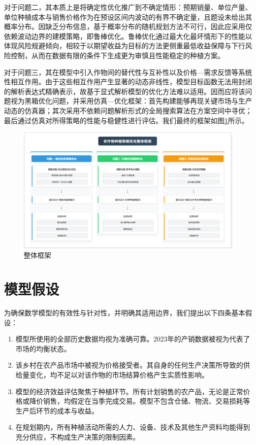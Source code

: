 对于问题二，其本质上是将确定性优化推广到不确定情形：预期销量、单位产量、单位种植成本与销售价格作为在预设区间内波动的有界不确定量，且题设未给出其概率分布。因缺乏分布信息，基于概率分布的随机规划方法不可行，因此应采用仅依赖波动边界的建模策略，即鲁棒优化。鲁棒优化通过最大化最坏情形下的性能以体现风险规避倾向，相较于以期望收益为目标的方法更侧重最低收益保障与下行风险控制，从而在数据有限的条件下生成更为审慎且性能稳定的种植方案。

对于问题三，其在模型中引入作物间的替代性与互补性以及价格—需求反馈等系统性相互作用。由于这些相互作用产生显著的动态非线性，模型目标函数无法用封闭的解析表达式精确表示，故基于显式解析模型的优化方法难以适用。因而应将该问题视为黑箱优化问题，并采用仿真—优化框架：首先构建能够再现关键市场与生产动态的仿真器；其次采用不依赖问题解析形式的全局搜索算法在方案空间中寻优；最后通过仿真对所得策略的性能与稳健性进行评估。我们最终的框架如图\ref{fig:all}所示。


\begin{figure}[htbp]
	\centering
	\includegraphics[width=\textwidth]{figs/1前置/全文框架}
	\caption{整体框架}
	\label{fig:all}
\end{figure}


\section{模型假设}


为确保数学模型的有效性与针对性，并明确其适用边界，我们提出以下四条基本假设：

\begin{enumerate}
    \item 模型所使用的全部历史数据均视为准确可靠。2023年的产销数据被视为代表了市场的均衡状态。

    \item 该乡村在农产品市场中被视为价格接受者。其自身的任何生产决策所导致的供给量变化，均不足以对该作物的市场结算价格产生实质性影响。

    \item 模型的经济效益评估聚焦于种植环节。所有计划销售的农产品，无论是正常价格或降价销售，均假定在当季完成交易。模型不包含仓储、物流、交易损耗等生产后环节的成本与收益。

    \item 在规划期内，所有种植活动所需的人力、设备、技术及其他生产资料均能得到充分供应，不构成生产决策的限制因素。

\end{enumerate}


